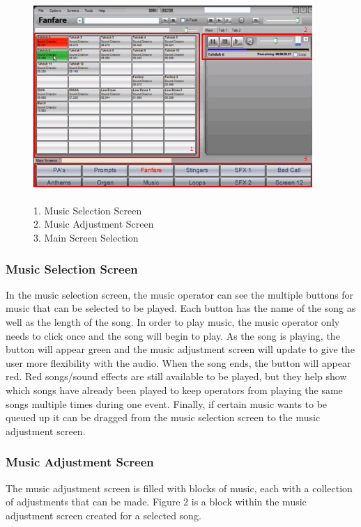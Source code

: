 \documentclass{article}
\begin{document}
\begin{figure}[h]
\begin{center}
\includegraphics[width=400px]{images/SoundDirector.png}
\caption{\\ 1. Music Selection Screen \\ 2. Music Adjustment Screen \\ 3. Main Screen Selection}
\end{center}
\end{figure}
 
\subsubsection{Music Selection Screen}
In the music selection screen, the music operator can see the multiple buttons for music that can be selected to be played. Each button has the name of the song as well as the length of the song. In order to play music, the music operator only needs to click once and the song will begin to play. As the song is playing, the button will appear green and the music adjustment screen will update to give the user more flexibility with the audio. When the song ends, the button will appear red. Red songs/sound effects are still available to be played, but they help show which songs have already been played to keep operators from playing the same songs multiple times during one event. Finally, if certain music wants to be queued up it can be dragged from the music selection screen to the music adjustment screen.

\subsubsection{Music Adjustment Screen}
The music adjustment screen is filled with blocks of music, each with a collection of adjustments that can be made. Figure 2 is a block within the music adjustment screen created for a selected song.
\end{document}
